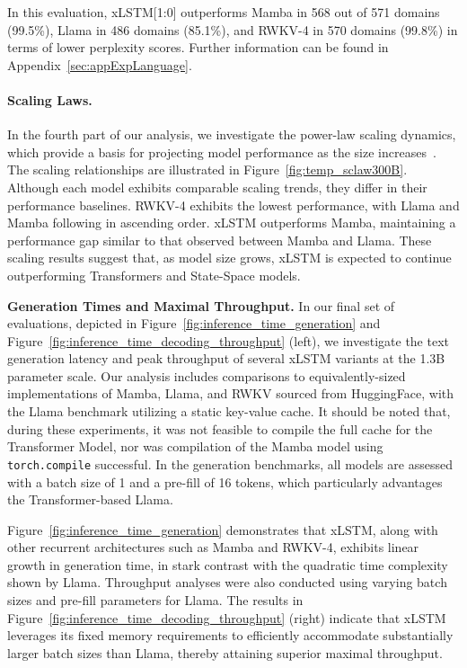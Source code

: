 In this evaluation, xLSTM[1:0] outperforms Mamba in 568 out of 571 domains (99.5\%), Llama in 486 domains (85.1\%), and RWKV-4 in 570 domains (99.8\%) in terms of lower perplexity scores. Further information can be found in Appendix~\ref{sec:appExpLanguage}.

\paragraph{Scaling Laws.} In the fourth part of our analysis, we investigate the power-law scaling dynamics, which provide a basis for projecting model performance as the size increases~\citep{Kaplan:20,Brown:20short}. The scaling relationships are illustrated in Figure~\ref{fig:temp_sclaw300B}. Although each model exhibits comparable scaling trends, they differ in their performance baselines. RWKV-4 exhibits the lowest performance, with Llama and Mamba following in ascending order. xLSTM outperforms Mamba, maintaining a performance gap similar to that observed between Mamba and Llama. These scaling results suggest that, as model size grows, xLSTM is expected to continue outperforming Transformers and State-Space models.

\textbf{Generation Times and Maximal Throughput.} In our final set of evaluations, depicted in Figure~\ref{fig:inference_time_generation} and Figure~\ref{fig:inference_time_decoding_throughput} (left), we investigate the text generation latency and peak throughput of several xLSTM variants at the 1.3B parameter scale. Our analysis includes comparisons to equivalently-sized implementations of Mamba, Llama, and RWKV sourced from HuggingFace, with the Llama benchmark utilizing a static key-value cache. It should be noted that, during these experiments, it was not feasible to compile the full cache for the Transformer Model, nor was compilation of the Mamba model using \texttt{torch.compile} successful. In the generation benchmarks, all models are assessed with a batch size of 1 and a pre-fill of 16 tokens, which particularly advantages the Transformer-based Llama.

Figure~\ref{fig:inference_time_generation} demonstrates that xLSTM, along with other recurrent architectures such as Mamba and RWKV-4, exhibits linear growth in generation time, in stark contrast with the quadratic time complexity shown by Llama. Throughput analyses were also conducted using varying batch sizes and pre-fill parameters for Llama. The results in Figure~\ref{fig:inference_time_decoding_throughput} (right) indicate that xLSTM leverages its fixed memory requirements to efficiently accommodate substantially larger batch sizes than Llama, thereby attaining superior maximal throughput.

